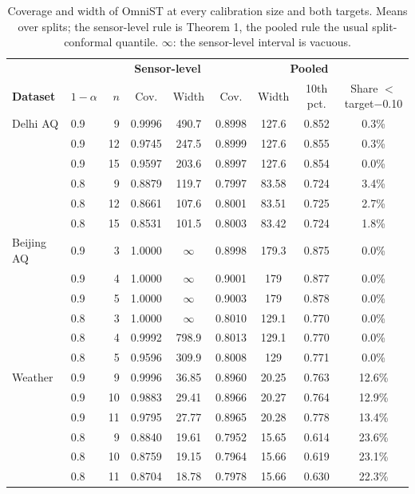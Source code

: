 \begin{table}[htbp]
\caption{Coverage and width of OmniST at every calibration size and both targets. Means over splits; the sensor-level rule is Theorem 1, the pooled rule the usual split-conformal quantile. $\infty$: the sensor-level interval is vacuous.}
\label{tab:fullcov}
\centering\small
\begin{tabular}{llrcccccc}
\toprule
 & & & \multicolumn{2}{c}{\textbf{Sensor-level}} & \multicolumn{4}{c}{\textbf{Pooled}} \\
\textbf{Dataset} & $1-\alpha$ & $n$ & Cov. & Width & Cov. & Width & 10th pct. & Share $<$ target$-$0.10 \\
\midrule
Delhi AQ & 0.9 & 9 & 0.9996 & 490.7 & 0.8998 & 127.6 & 0.852 & 0.3\% \\
 & 0.9 & 12 & 0.9745 & 247.5 & 0.8999 & 127.6 & 0.855 & 0.3\% \\
 & 0.9 & 15 & 0.9597 & 203.6 & 0.8997 & 127.6 & 0.854 & 0.0\% \\
 & 0.8 & 9 & 0.8879 & 119.7 & 0.7997 & 83.58 & 0.724 & 3.4\% \\
 & 0.8 & 12 & 0.8661 & 107.6 & 0.8001 & 83.51 & 0.725 & 2.7\% \\
 & 0.8 & 15 & 0.8531 & 101.5 & 0.8003 & 83.42 & 0.724 & 1.8\% \\
\midrule
Beijing AQ & 0.9 & 3 & 1.0000 & $\infty$ & 0.8998 & 179.3 & 0.875 & 0.0\% \\
 & 0.9 & 4 & 1.0000 & $\infty$ & 0.9001 & 179 & 0.877 & 0.0\% \\
 & 0.9 & 5 & 1.0000 & $\infty$ & 0.9003 & 179 & 0.878 & 0.0\% \\
 & 0.8 & 3 & 1.0000 & $\infty$ & 0.8010 & 129.1 & 0.770 & 0.0\% \\
 & 0.8 & 4 & 0.9992 & 798.9 & 0.8013 & 129.1 & 0.770 & 0.0\% \\
 & 0.8 & 5 & 0.9596 & 309.9 & 0.8008 & 129 & 0.771 & 0.0\% \\
\midrule
Weather & 0.9 & 9 & 0.9996 & 36.85 & 0.8960 & 20.25 & 0.763 & 12.6\% \\
 & 0.9 & 10 & 0.9883 & 29.41 & 0.8966 & 20.27 & 0.764 & 12.9\% \\
 & 0.9 & 11 & 0.9795 & 27.77 & 0.8965 & 20.28 & 0.778 & 13.4\% \\
 & 0.8 & 9 & 0.8840 & 19.61 & 0.7952 & 15.65 & 0.614 & 23.6\% \\
 & 0.8 & 10 & 0.8759 & 19.15 & 0.7964 & 15.66 & 0.619 & 23.1\% \\
 & 0.8 & 11 & 0.8704 & 18.78 & 0.7978 & 15.66 & 0.630 & 22.3\% \\

\end{tabular}
\end{table}
